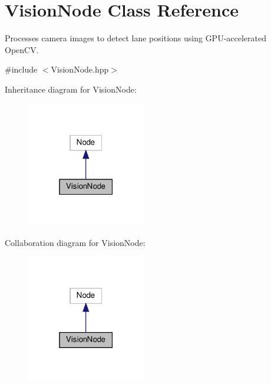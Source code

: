 \hypertarget{classVisionNode}{}\section{Vision\+Node Class Reference}
\label{classVisionNode}


Processes camera images to detect lane positions using G\+P\+U-\/accelerated Open\+CV.  




{\ttfamily \#include $<$Vision\+Node.\+hpp$>$}



Inheritance diagram for Vision\+Node\+:
\nopagebreak
\begin{figure}[H]
\begin{center}
\leavevmode
\includegraphics[width=147pt]{classVisionNode__inherit__graph}
\end{center}
\end{figure}


Collaboration diagram for Vision\+Node\+:
\nopagebreak
\begin{figure}[H]
\begin{center}
\leavevmode
\includegraphics[width=147pt]{classVisionNode__coll__graph}
\end{center}
\end{figure}
